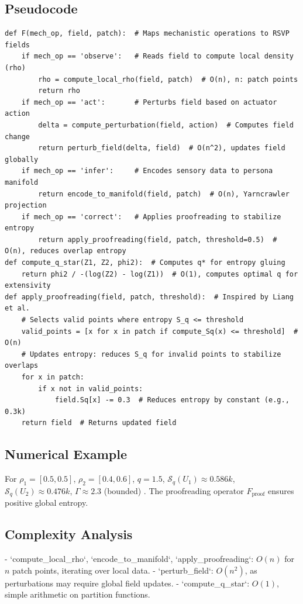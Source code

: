 \documentclass{article}
\theoremstyle{plain}
\theoremstyle{definition}
\begin{document}
\subsection{Pseudocode}
\lstset{language=Python, basicstyle=\small\ttfamily, breaklines=true, columns=flexible}
\begin{lstlisting}
def F(mech_op, field, patch):  # Maps mechanistic operations to RSVP fields
    if mech_op == 'observe':   # Reads field to compute local density (rho)
        rho = compute_local_rho(field, patch)  # O(n), n: patch points
        return rho
    if mech_op == 'act':       # Perturbs field based on actuator action
        delta = compute_perturbation(field, action)  # Computes field change
        return perturb_field(delta, field)  # O(n^2), updates field globally
    if mech_op == 'infer':     # Encodes sensory data to persona manifold
        return encode_to_manifold(field, patch)  # O(n), Yarncrawler projection
    if mech_op == 'correct':   # Applies proofreading to stabilize entropy
        return apply_proofreading(field, patch, threshold=0.5)  # O(n), reduces overlap entropy
def compute_q_star(Z1, Z2, phi2):  # Computes q* for entropy gluing
    return phi2 / -(log(Z2) - log(Z1))  # O(1), computes optimal q for extensivity
def apply_proofreading(field, patch, threshold):  # Inspired by Liang et al.
    # Selects valid points where entropy S_q <= threshold
    valid_points = [x for x in patch if compute_Sq(x) <= threshold]  # O(n)
    # Updates entropy: reduces S_q for invalid points to stabilize overlaps
    for x in patch:
        if x not in valid_points:
            field.Sq[x] -= 0.3  # Reduces entropy by constant (e.g., 0.3k)
    return field  # Returns updated field
\end{lstlisting}

\subsection{Numerical Example}
For $\rho_1 = [0.5, 0.5]$, $\rho_2 = [0.4, 0.6]$, $q=1.5$, $\mathcal{S}_q(U_1) \approx 0.586k$, $\mathcal{S}_q(U_2) \approx 0.476k$, $\Gamma \approx 2.3$ (bounded) \cite{Soares2024}. The proofreading operator $F_\text{proof}$ ensures positive global entropy.

\subsection{Complexity Analysis}
- `compute_local_rho`, `encode_to_manifold`, `apply_proofreading`: $O(n)$ for $n$ patch points, iterating over local data.
- `perturb_field`: $O(n^2)$, as perturbations may require global field updates.
- `compute_q_star`: $O(1)$, simple arithmetic on partition functions.
\end{document}
